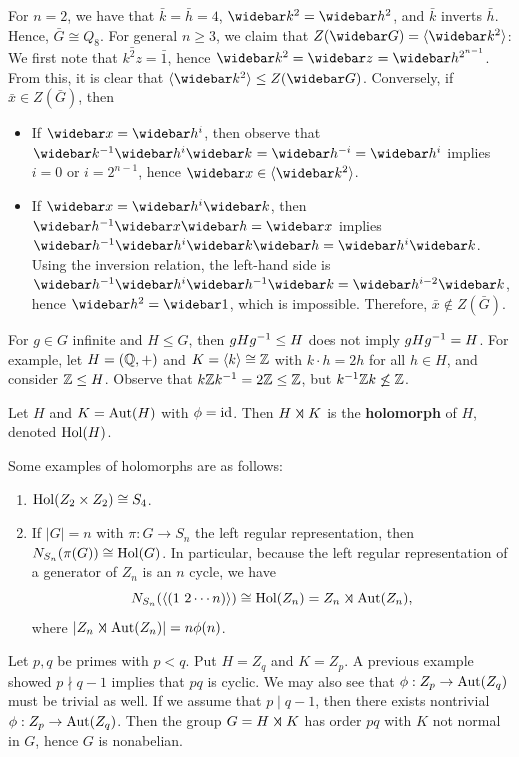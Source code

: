 For $n = 2$, we have that $\bar k = \bar h = 4$, $\bbar k[2] = \bbar h[2]$, and $\bar k$ inverts $\bar h$. Hence, $\bar G \cong Q_8$. For general $n \geq 3$, we claim that $Z(\bar G) = \gen{\bbar k[2]}$: We first note that $\bar{k^2z} = \bar 1$, hence $\bbar k[2] = \bbar z = \bbar h[2^{n-1}]$. From this, it is clear that $\gen{\bbar k[2]} \leq Z(\bar G)$. Conversely, if $\bar x \in Z(\bar G)$, then
\begin{itemize}
    \item If $\bar x = \bbar h[i]$, then observe that $\bbar k[-1] \bbar h[i] \bbar k = \bbar h[-i] = \bbar h[i]$ implies $i = 0$ or $i = 2^{n-1}$, hence $\bar x \in \gen{\bbar k[2]}$.
    \item If $\bar x = \bbar h[i] \bar k$, then $\bbar h[-1]\bar x \bar h = \bar x$ implies $\bbar h[-1] \bbar h[i] \bar k \bar h = \bbar h[i] \bar k$. Using the inversion relation, the left-hand side is $\bbar h[-1] \bbar h[i] \bbar h[-1] \bar k = \bbar h[i-2] \bar k$, hence $\bbar h[2] = \bar 1$, which is impossible. Therefore, $\bar x \not\in Z(\bar G)$.
\end{itemize}

\note For $g \in G$ infinite and $H \leq G$, then $gHg^{-1} \leq H$ does not imply $gHg^{-1} = H$. For example, let $H = (\mathbb Q, +)$ and $K = \langle k\rangle \cong \mathbb Z$ with $k \cdot h = 2h$ for all $h \in H$, and consider $\mathbb Z \leq H$. Observe that $k\mathbb Z k^{-1} = 2\mathbb Z \leq \mathbb Z$, but $k^{-1} \mathbb Z k \not\leq \mathbb Z$.

 Let $H$ and $K = \operatorname{Aut}(H)$ with $\phi = \operatorname{id}$. Then $H \semidir K$ is the \textbf{holomorph} of $H$, denoted $\operatorname{Hol}(H)$.

\ex Some examples of holomorphs are as follows:
\begin{enumerate}
    \item $\operatorname{Hol}(Z_2 \times Z_2) \cong S_4$.
    \item If $|G| = n$ with $\pi : G \to S_n$ the left regular representation, then $N_{S_n}(\pi(G)) \cong \operatorname{Hol}(G)$. In particular, because the left regular representation of a generator of $Z_n$ is an $n$ cycle, we have
    \[N_{S_n}(\gen{(1\ 2 \cdots n)}) \cong \hol(Z_n) = Z_n \semidir \aut(Z_n),\]
    where $|Z_n \semidir \aut(Z_n)| = n\phi(n)$.
\end{enumerate}

\ex Let $p, q$ be primes with $p < q$. Put $H = Z_q$ and $K = Z_p$. A previous example showed $p \nmid q - 1$ implies that $pq$ is cyclic. We may also see that $\phi : Z_p \to \operatorname{Aut}(Z_q)$ must be trivial as well. If we assume that $p \mid q - 1$, then there exists nontrivial $\phi : Z_p \to \operatorname{Aut}(Z_q)$. Then the group $G = H \semidir K$ has order $pq$ with $K$ not normal in $G$, hence $G$ is nonabelian.

